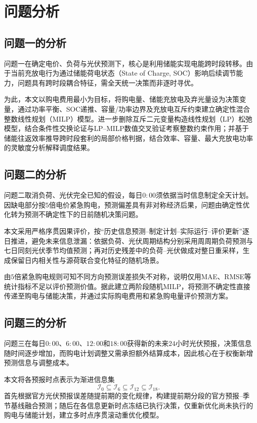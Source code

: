 \section{问题分析}

\subsection{问题一的分析}

问题一在确定电价、负荷与光伏预测下，核心是利用储能实现电能跨时段转移。由于当前充放电行为通过储能荷电状态（State of Charge, SOC）影响后续调节能力，问题具有跨时段耦合特征，需全天统一决策而非逐时寻优。

为此，本文以购电费用最小为目标，将购电量、储能充放电及弃光量设为决策变量，通过功率平衡、SOC递推、容量/功率边界及充放电互斥约束建立确定性混合整数线性规划（MILP）模型。进一步删除互斥二元变量构造线性规划（LP）松弛模型，结合条件性交换论证与LP--MILP数值交叉验证考察整数约束作用；并基于储能往返效率推导跨时段套利的局部价格判据，结合效率、容量、最大充放电功率的灵敏度分析解释调度结果。

\subsection{问题二的分析}

问题二取消负荷、光伏完全已知的假设，每日$0{:}00$须依据当时信息制定全天计划。因缺电部分按$5$倍电价紧急购电，预测偏差具有非对称经济后果，问题由确定性优化转为预测不确定性下的日前随机决策问题。

本文采用严格序贯因果评价，按“历史信息预测--制定计划--实际运行--评价更新”逐日推进，避免未来信息泄漏：依据负荷、光伏周期结构分别采用周周期负荷预测与七日同刻光伏季节均值预测；再对历史残差中的负荷--光伏做成对整日重采样，生成保留日内相关性与源荷联合变化特征的随机场景。

由$5$倍紧急购电规则可知不同方向预测误差损失不对称，说明仅用MAE、RMSE等统计指标不足以评价预测价值。据此建立两阶段随机MILP，将预测不确定性直接传递至购电与储能决策，并通过实际购电费用和紧急购电量评价预测方案。

\subsection{问题三的分析}

问题三在每日$0{:}00$、$6{:}00$、$12{:}00$和$18{:}00$获得新的未来$24$小时光伏预报，决策信息随时间逐步增加，而购电计划调整又需承担额外结算成本，因此核心在于权衡新增预测信息与调整成本。

本文将各预报时点表示为渐进信息集
\[
\mathcal I_0\subseteq\mathcal I_6\subseteq\mathcal I_{12}\subseteq\mathcal I_{18}.
\]
首先根据官方光伏预报误差随提前期的变化规律，构建提前期分段的官方预报--季节基线融合预测；随后在各信息更新时点冻结已执行决策，仅重新优化尚未执行的购电与储能计划，建立多时点序贯滚动重优化模型。

